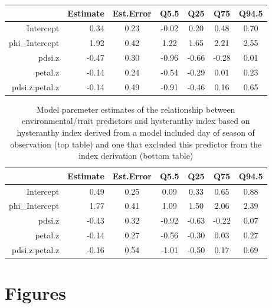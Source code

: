 \documentclass{article}[11pt]
\begin{document}
\begin{table}[ht]
\centering
\begin{tabular}{rrccccc}
  \hline
 & Estimate & Est.Error & Q5.5 & Q25 & Q75 & Q94.5 \\ 
  \hline
Intercept & 0.34 & 0.23 & -0.02 & 0.20 & 0.48 & 0.70 \\ 
  phi\_Intercept & 1.92 & 0.42 & 1.22 & 1.65 & 2.21 & 2.55 \\ 
  pdsi.z & -0.47 & 0.30 & -0.96 & -0.66 & -0.28 & 0.01 \\ 
  petal.z & -0.14 & 0.24 & -0.54 & -0.29 & 0.01 & 0.23 \\ 
  pdsi.z:petal.z & -0.14 & 0.49 & -0.91 & -0.46 & 0.16 & 0.65 \\ 
   \hline
\end{tabular}
\end{table}
\begin{table}
\centering
\begin{tabular}{rrccccc}
  \hline
 & Estimate & Est.Error & Q5.5 & Q25 & Q75 & Q94.5 \\ 
  \hline
Intercept & 0.49 & 0.25 & 0.09 & 0.33 & 0.65 & 0.88 \\ 
  phi\_Intercept & 1.77 & 0.41 & 1.09 & 1.50 & 2.06 & 2.39 \\ 
  pdsi.z & -0.43 & 0.32 & -0.92 & -0.63 & -0.22 & 0.07 \\ 
  petal.z & -0.14 & 0.27 & -0.56 & -0.30 & 0.03 & 0.27 \\ 
  pdsi.z:petal.z & -0.16 & 0.54 & -1.01 & -0.50 & 0.17 & 0.69 \\ 
   \hline
\end{tabular}
\label{tab:nodoy}
\caption{Model paremeter estimates of the relationship between environmental/trait predictors and hysteranthy index based on hysteranthy index derived from a model included day of season of observation (top table) and one that excluded this predictor from the index derivation (bottom table)}
\end{table}

\pagebreak[4]

\section*{Figures} 
\end{document}
